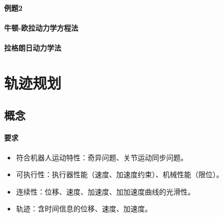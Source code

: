 \documentclass[
12pt, %
a4paper, 
oneside, %
headinclude,footinclude, %
]{scrartcl}
\begin{document}
{\paragraph{例题2}

\paragraph{牛顿-欧拉动力学方程法}

\paragraph{拉格朗日动力学法}

}
\section{轨迹规划}
\subsection[概念]{概念}
\paragraph{要求}
\begin{itemize}
\item 符合机器人运动特性：奇异问题、关节运动同步问题。
\item 可执行性：执行器性能（速度、加速度约束）、机械性能（限位）。
\item 连续性：位移、速度、加速度、加加速度曲线的光滑性。
\item 轨迹：含时间信息的位移、速度、加速度。
\end{itemize}
\end{document}
